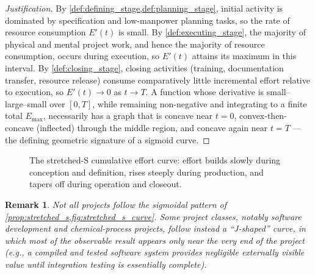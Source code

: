 \documentclass[12pt, a4paper]{report}
\theoremstyle{engnotes}
\newtheorem{remark}{Remark}[section]
\begin{document}
\begin{proof}[Justification]
    By \cref{def:defining_stage,def:planning_stage}, initial activity is dominated by specification and low-manpower planning tasks, so the rate of resource consumption $E'(t)$ is small. By \cref{def:executing_stage}, the majority of physical and mental project work, and hence the majority of resource consumption, occurs during execution, so $E'(t)$ attains its maximum in this interval. By \cref{def:closing_stage}, closing activities (training, documentation transfer, resource release) consume comparatively little incremental effort relative to execution, so $E'(t) \to 0$ as $t \to T$. A function whose derivative is small--large--small over $[0,T]$, while remaining non-negative and integrating to a finite total $E_{\max}$, necessarily has a graph that is concave near $t=0$, convex-then-concave (inflected) through the middle region, and concave again near $t=T$ --- the defining geometric signature of a sigmoid curve.
\end{proof}

\begin{figure}[H]
    \centering
    \caption{The stretched-S cumulative effort curve: effort builds slowly during conception and definition, rises steeply during production, and tapers off during operation and closeout.}
    \label{fig:stretched_s_curve}
\end{figure}

\begin{remark}
    Not all projects follow the sigmoidal pattern of \cref{prop:stretched_s,fig:stretched_s_curve}. Some project classes, notably software development and chemical-process projects, follow instead a ``J-shaped'' curve, in which most of the observable result appears only near the very end of the project (e.g., a compiled and tested software system provides negligible externally visible value until integration testing is essentially complete).
\end{remark}
\end{document}
